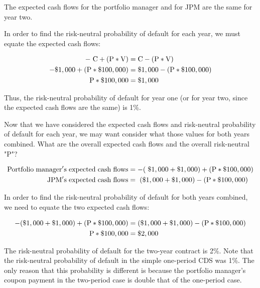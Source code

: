 \documentclass[article]{jss}
\begin{document}
The expected cash flows for the portfolio manager and for JPM are the same for year two. 

In order to find the risk-neutral probability of default for each year, we must equate the expected cash flows:

\label{eqn:SimpleTwoPeriod}
\begin{align}
  \rm -\hspace{3pt}C + (P * V)  &= \rm C - (P * V) \\
  \rm - \$1,000 + (P * \$100,000) &= \rm \$1,000 - (P * \$100,000) \\
  \rm P * {\$100,000}  &= \rm \$1,000
\end{align}


Thus, the risk-neutral probability of default for year one (or for year two, since the expected cash flows are the same) is 1\%. 

Now that we have considered the expected cash flows and risk-neutral probability of default for each year, we may want consider what those values for both years combined. What are the overall expected cash flows and the overall risk-neutral "P"?

\begin{align}
  \rm Portfolio\hspace{3pt}manager's\hspace{3pt}expected\hspace{3pt}cash\hspace{3pt}flows &= \rm -(\hspace{3pt}\$1,000 + \$1,000) + (P * {\$100,000}) \\
  \rm JPM's\hspace{3pt}expected\hspace{3pt}cash\hspace{3pt}flows &= \rm \hspace{3pt}(\$1,000 + \$1,000) - (P * {\$100,000})
  \end{align}

In order to find the risk-neutral probability of default for both years combined, we need to equate the two expected cash flows:

\label{eqn:twoPeriod}
\begin{align}
  \rm - (\$1,000 + \$1,000) + (P * \$100,000) &= \rm (\$1,000 + \$1,000) - (P * \$100,000) \\
  \rm P * {\$100,000}  &= \rm \$2,000
\end{align}

The risk-neutral probability of default for the two-year contract is 2\%. Note that the risk-neutral probability of default in the simple one-period CDS was 1\%. The only reason that this probability is different is because the portfolio manager's coupon payment in the two-period case is double that of the one-period case.
\end{document}

